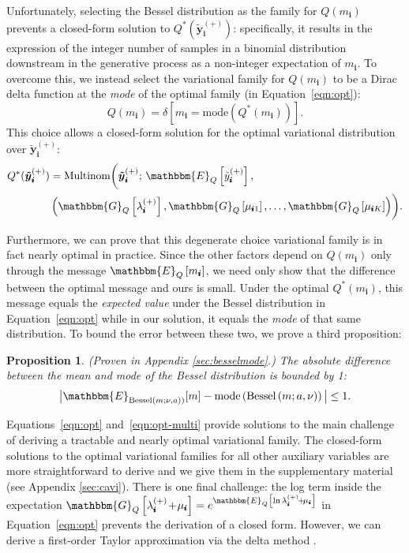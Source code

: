 \documentclass[letterpaper]{article}
\newcommand{\subs}{\pmb{i}}
\newcommand{\wsup}[2]{#1_{\subs}^{(#2)}}
\newcommand{\ytP}{\wsup{\tilde{y}}{+}}
\newcommand{\lamP}{\wsup{\lambda}{+}}
\newcommand{\mus}{\mu_{\subs}}
\newcommand{\ms}{m_{\subs}}
\newcommand{\Bess}[1]{\textup{Bessel}\left( #1 \right)}
\newcommand{\Eq}[1]{\mathbbm{E}_Q\left[#1\right]}
\newcommand{\Gq}[1]{\mathbbm{G}_Q\left[#1\right]}
\newcommand{\teq}{\!=\!}
\newcommand{\tp}{\!+\!}
\newcommand{\yvtP}{\boldsymbol{\tilde{y}}_{\subs}^{(+)}}
\newtheorem{proposition}{Proposition}
\begin{document}
  Unfortunately, selecting the Bessel distribution as the family for $Q(\ms)$
  prevents a closed-form solution to $Q^*(\yvtP)$: specifically, it results in
  the expression of the integer number of samples in a binomial distribution
  downstream in the generative process as a non-integer expectation of $\ms$. To
  overcome this, we instead select the variational family for $Q(\ms)$ to be a
  Dirac delta function at the \emph{mode} of the optimal family (in
  Equation~\ref{eqn:opt}):
  \begin{equation}
  Q(\ms) = \delta\left[\ms \teq \textrm{mode}(Q^*(\ms))\right].
  \end{equation}
  This choice allows a closed-form solution for the optimal variational
  distribution over $\yvtP$:
  \begin{align}
  \label{eqn:opt-multi}
  \begin{split}
  Q^*(\yvtP) &= \textup{Multinom} \biggl(\yvtP;\, \Eq{\ytP},\\
  &\left(\Gq{\lamP}, \Gq{\mu_{\subs 1}}, \dots, \Gq{\mu_{\subs K}} \right) \biggr).
  \end{split}
  \end{align}

  Furthermore, we can prove that this degenerate choice variational family is in
  fact nearly optimal in practice. Since the other factors depend on $Q(\ms)$
  only through the message $\Eq{\ms}$, we need only show that the difference
  between the optimal message and ours is small. Under the optimal $Q^*(\ms)$,
  this message equals the \emph{expected value} under the Bessel distribution in
  Equation~\ref{eqn:opt} while in our solution, it equals the \emph{mode} of
  that same distribution. To bound the error between these two, we prove a
  third proposition:
  
  \begin{proposition} (Proven in Appendix \ref{sec:besselmode}.) The absolute
  difference between the mean and mode of the Bessel distribution is bounded by
  1:
    \[ \big| \mathbbm{E}_{\Bess{m; \nu, a})}[m]  - \textup{mode} \left(\Bess{m;
    a, \nu} \right) \big|  \leq 1. \]
  \end{proposition}
  
  Equations~\ref{eqn:opt} and~\ref{eqn:opt-multi} provide solutions to the main
  challenge of deriving a tractable and nearly optimal variational family. The
  closed-form solutions to the optimal variational families for all other
  auxiliary variables are more straightforward to derive and we give them in the
  supplementary material (see Appendix \ref{sec:cavi}). There is one final
  challenge: the log term inside the expectation $\Gq{\lamP \tp \mus} =
  e^{\Eq{\ln \lamP \tp \mus}}$ in Equation~\ref{eqn:opt} prevents the derivation
  of a closed form. However, we can derive a first-order Taylor approximation
  via the delta method \citep{ver2012invented}.
  
\end{document}
